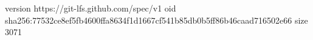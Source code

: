 version https://git-lfs.github.com/spec/v1
oid sha256:77532ce8ef5fb4600ffa8634f1d1667cf541b85db0b5ff86b46caad716502e66
size 3071
